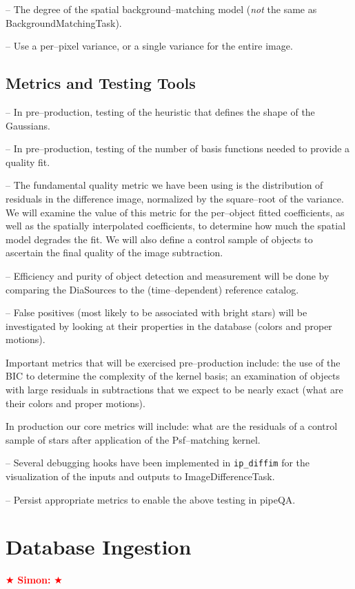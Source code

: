 \documentclass[12pt]{article}
\newcommand{\simon} { \textcolor{red} {
\ensuremath{\bigstar} {\bf Simon:}  
\ensuremath{\bigstar} } }
\begin{document}
-- The degree of the spatial background--matching model ({\it not} the
same as BackgroundMatchingTask).

-- Use a per--pixel variance, or a single variance for the entire
image.

\subsection{Metrics and Testing Tools}

-- In pre--production, testing of the heuristic that defines the shape
of the Gaussians.

-- In pre--production, testing of the number of basis functions needed
to provide a quality fit.  

-- The fundamental quality metric we have been using is the
distribution of residuals in the difference image, normalized by the
square--root of the variance.  We will examine the value of this
metric for the per--object fitted coefficients, as well as the
spatially interpolated coefficients, to determine how much the spatial
model degrades the fit.  We will also define a control sample of
objects to ascertain the final quality of the image subtraction.

-- Efficiency and purity of object detection and measurement will be
done by comparing the DiaSources to the (time--dependent) reference
catalog.

-- False positives (most likely to be associated with bright stars)
will be investigated by looking at their properties in the database
(colors and proper motions).

Important metrics that will be exercised pre--production include: the
use of the BIC to determine the complexity of the kernel basis; an
examination of objects with large residuals in subtractions that we
expect to be nearly exact (what are their colors and proper motions).

In production our core metrics will include: what are the residuals of
a control sample of stars after application of the Psf--matching
kernel.

-- Several debugging hooks have been implemented in {\tt ip\_diffim} for
the visualization of the inputs and outputs to ImageDifferenceTask.

-- Persist appropriate metrics to enable the above testing in pipeQA.


\clearpage 
\section{Database Ingestion} \simon
\end{document}
